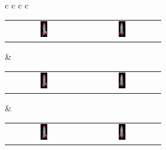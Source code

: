 \begin{table}[!htb]
\begin{tabular*}{\textwidth}{ c c c c }
        
        \setlength\tabcolsep{0pt}
        \begin{tabular}{cc}
            \includegraphics[width=0.1\textwidth]{figures/results/col_set/rocket0_targ_256px.png} & \includegraphics[width=0.1\textwidth]{figures/results/col_set/rocket4_targ_256px.png}
        \end{tabular}
        &
        \setlength\tabcolsep{0pt}
        \begin{tabular}{cc}
            \includegraphics[width=0.1\textwidth]{figures/results/col_set/rocket0_excol_150k.png} & \includegraphics[width=0.1\textwidth]{figures/results/col_set/rocket4_excol_150k.png}
        \end{tabular}
        &
        \setlength\tabcolsep{0pt}
        \begin{tabular}{cc}
            \includegraphics[width=0.1\textwidth]{figures/results/col_set/rocket0_exva_150k.png} & \includegraphics[width=0.1\textwidth]{figures/results/col_set/rocket4_exva_150k.png}

\end{tabular}
\end{tabular*}
\end{table}
